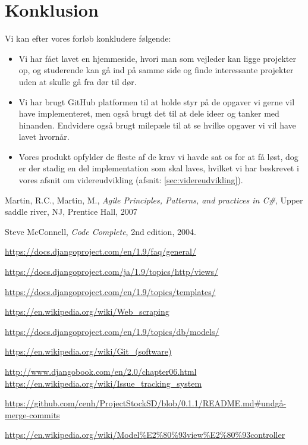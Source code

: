 \documentclass[12pt]{article}
\begin{document}
\section{Konklusion}
\label{sec:konklusion}
Vi kan efter vores forløb konkludere følgende:
\begin{itemize}
\item Vi har fået lavet en hjemmeside, hvori man som vejleder kan ligge projekter op, og studerende kan gå ind på samme side og finde interessante projekter uden at skulle gå fra dør til dør.
\item Vi har brugt GitHub platformen til at holde styr på de opgaver vi gerne vil have implementeret, men også brugt det til at dele ideer og tanker med hinanden. Endvidere også brugt milepæle til at se hvilke opgaver vi vil have lavet hvornår.
\item Vores produkt opfylder de fleste af de krav vi havde sat os for at få løst, dog er der stadig en del implementation som skal laves, hvilket vi har beskrevet i vores afsnit om videreudvikling (afsnit: \ref{sec:videreudvikling}).
\end{itemize}

\newpage
\begin{thebibliography}{9}

	Martin, R.C., Martin, M.,
	\emph{Agile Principles, Patterns, and practices in C\#},
	Upper saddle river, NJ, Prentice Hall,
	2007

	Steve McConnell,
	\emph{Code Complete},
	2nd edition,
	2004.

	\url{https://docs.djangoproject.com/en/1.9/faq/general/}

	\url{https://docs.djangoproject.com/ja/1.9/topics/http/views/}

	\url{https://docs.djangoproject.com/en/1.9/topics/templates/}

    \url{https://en.wikipedia.org/wiki/Web_scraping}

    \url{https://docs.djangoproject.com/en/1.9/topics/db/models/}

    \url{https://en.wikipedia.org/wiki/Git_(software)}

    \url{http://www.djangobook.com/en/2.0/chapter06.html}
    \url{https://en.wikipedia.org/wiki/Issue_tracking_system}

    \url{https://github.com/cenh/ProjectStockSD/blob/0.1.1/README.md#undgå-merge-commits}

    \url{https://en.wikipedia.org/wiki/Model%E2%80%93view%E2%80%93controller}

\end{thebibliography}
\end{document}
